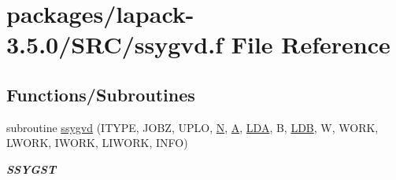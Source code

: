 \hypertarget{ssygvd_8f}{}\section{packages/lapack-\/3.5.0/\+S\+R\+C/ssygvd.f File Reference}
\label{ssygvd_8f}
\subsection*{Functions/\+Subroutines}
\begin{DoxyCompactItemize}
\item 
subroutine \hyperlink{group__realSYeigen_ga728a73f9991d8490e62135c31c2017b8}{ssygvd} (I\+T\+Y\+P\+E, J\+O\+B\+Z, U\+P\+L\+O, \hyperlink{polmisc_8c_a0240ac851181b84ac374872dc5434ee4}{N}, \hyperlink{classA}{A}, \hyperlink{example__user_8c_ae946da542ce0db94dced19b2ecefd1aa}{L\+D\+A}, B, \hyperlink{example__user_8c_a50e90a7104df172b5a89a06c47fcca04}{L\+D\+B}, W, W\+O\+R\+K, L\+W\+O\+R\+K, I\+W\+O\+R\+K, L\+I\+W\+O\+R\+K, I\+N\+F\+O)
\begin{DoxyCompactList}\small\item\em {\bfseries S\+S\+Y\+G\+S\+T} \end{DoxyCompactList}\end{DoxyCompactItemize}
